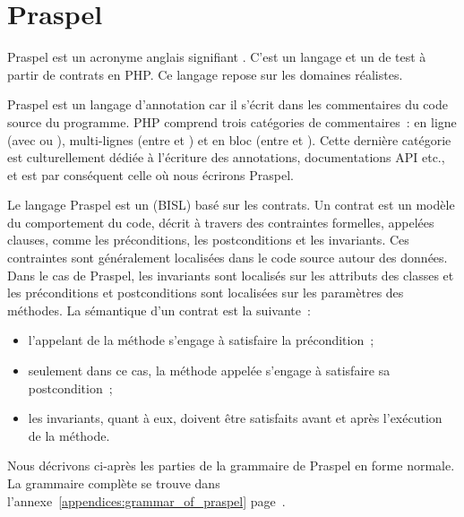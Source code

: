 \def\gsep{$\quad::=\quad$}
\def\mvert{$\;\;|\;\;$}
\def\mvertp{\phantom{$\;\;|\;\;$}}
\newcommand{\gtoken}[1]{\underline{\code{php-#1}}}
\newcommand{\grule}[1]{\textit{#1}}

\section{Praspel}
\label{section:language:praspel}

Praspel est un acronyme anglais signifiant . C'est un langage et un 
de test à partir de contrats en PHP. Ce langage repose sur les domaines
réalistes.

Praspel est un {\strong langage d'annotation} car il s'écrit dans les
commentaires du code source du programme. PHP comprend trois catégories de
commentaires~: en ligne (avec \code{//} ou \code{\#}), multi-lignes (entre
\code{/*} et \code{*/}) et en bloc (entre \code{/**} et \code{*/}). Cette
dernière catégorie est culturellement dédiée à l'écriture des annotations,
documentations API etc., et est par conséquent celle où nous écrirons Praspel.

Le langage Praspel est un  ({\strong BISL}) basé sur les contrats. Un contrat est un modèle du
comportement du code, décrit à travers des contraintes formelles, appelées
clauses, comme les préconditions, les postconditions et les invariants. Ces
contraintes sont généralement localisées dans le code source autour des données.
Dans le cas de Praspel, les invariants sont localisés sur les attributs des
classes et les préconditions et postconditions sont localisées sur les
paramètres des méthodes. La sémantique d'un contrat est la suivante~:

\begin{itemize}

\item l'appelant de la méthode s'engage à satisfaire la précondition~;

\item seulement dans ce cas, la méthode appelée s'engage à satisfaire sa
postcondition~;

\item les invariants, quant à eux, doivent être satisfaits avant et après
l'exécution de la méthode.

\end{itemize}

Nous décrivons ci-après les parties de la grammaire de Praspel en forme normale.
La grammaire complète se trouve dans
l'annexe~\ref{appendices:grammar_of_praspel}
page~\pageref{appendices:grammar_of_praspel}.

